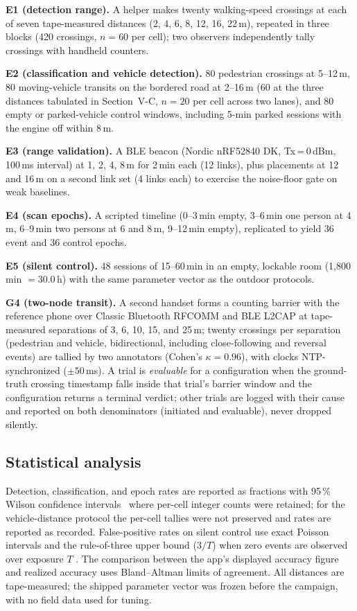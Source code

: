 \documentclass[journal,10pt]{IEEEtran}
\begin{document}
\textbf{E1 (detection range).} A helper makes twenty walking-speed crossings
at each of seven tape-measured distances (2, 4, 6, 8, 12, 16, 22\,m), repeated
in three blocks (420 crossings, $n=60$ per cell); two observers independently
tally crossings with handheld counters.

\textbf{E2 (classification and vehicle detection).} 80 pedestrian crossings at
5--12\,m, 80 moving-vehicle transits on the bordered road at 2--16\,m (60 at
the three distances tabulated in Section~V-C, $n=20$ per cell across two
lanes), and 80 empty or parked-vehicle control windows, including 5-min parked
sessions with the engine off within 8\,m.

\textbf{E3 (range validation).} A BLE beacon (Nordic nRF52840 DK,
Tx\,=\,0\,dBm, 100\,ms interval) at 1, 2, 4, 8\,m for 2\,min each (12 links),
plus placements at 12 and 16\,m on a second link set (4 links each) to
exercise the noise-floor gate on weak baselines.

\textbf{E4 (scan epochs).} A scripted timeline (0--3\,min empty, 3--6\,min one
person at 4\,m, 6--9\,min two persons at 6 and 8\,m, 9--12\,min empty),
replicated to yield 36 event and 36 control epochs.

\textbf{E5 (silent control).} 48 sessions of 15--60\,min in an empty, lockable
room (1{,}800\,min $=30.0$\,h) with the same parameter vector as the outdoor
protocols.

\textbf{G4 (two-node transit).} A second handset forms a counting barrier with
the reference phone over Classic Bluetooth RFCOMM and BLE L2CAP at
tape-measured separations of 3, 6, 10, 15, and 25\,m; twenty crossings per
separation (pedestrian and vehicle, bidirectional, including close-following
and reversal events) are tallied by two annotators (Cohen's $\kappa = 0.96$),
with clocks NTP-synchronized ($\pm50$\,ms). A trial is \emph{evaluable} for a
configuration when the ground-truth crossing timestamp falls inside that
trial's barrier window and the configuration returns a terminal verdict; other
trials are logged with their cause and reported on both denominators
(initiated and evaluable), never dropped silently.

\subsection{Statistical analysis}
Detection, classification, and epoch rates are reported as fractions with
95\,\% Wilson confidence intervals~\cite{Brown20183Wilson} where per-cell
integer counts were retained; for the vehicle-distance protocol the per-cell
tallies were not preserved and rates are reported as recorded. False-positive
rates on silent control use exact Poisson intervals and the rule-of-three
upper bound ($3/T$) when zero events are observed over exposure $T$
\cite{Hanley1983RuleOfThree}. The comparison between the app's displayed
accuracy figure and realized accuracy uses Bland--Altman limits of agreement.
All distances are tape-measured; the shipped parameter vector was frozen
before the campaign, with no field data used for tuning.
\end{document}
